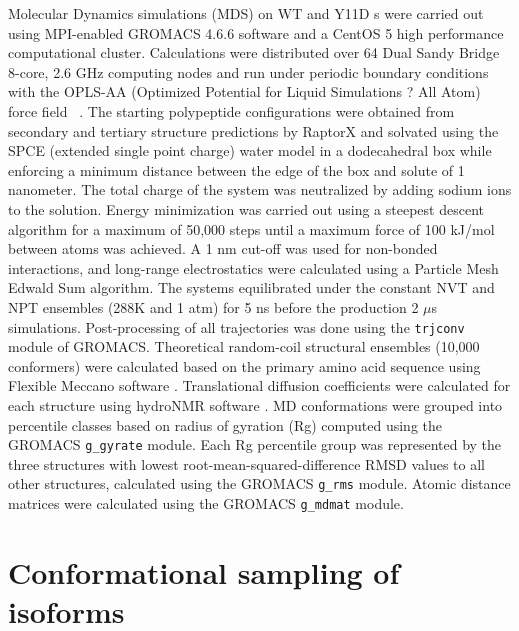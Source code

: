 Molecular Dynamics simulations (MDS) on WT and Y11D \gct{}s were carried out using MPI-enabled GROMACS 4.6.6 software\cite{hess2008gromacs} and a CentOS 5 high performance computational cluster. Calculations were distributed over 64 Dual Sandy Bridge 8-core, 2.6 GHz computing nodes and run under periodic boundary conditions with the OPLS-AA (Optimized Potential for Liquid Simulations ? All Atom) force field ~\cite{kaminski2001evaluation}.  The starting \gct{} polypeptide configurations were obtained from secondary and tertiary structure predictions by RaptorX \cite{kallberg2012template} and solvated using the SPCE (extended single point charge) water model in a dodecahedral box while enforcing a minimum distance between the edge of the box and solute of 1 nanometer. The total charge of the system was neutralized by adding sodium ions to the solution. Energy minimization was carried out using a steepest descent algorithm for a maximum of 50,000 steps until a maximum force of 100 kJ/mol between atoms was achieved. A 1 nm cut-off was used for non-bonded interactions, and long-range electrostatics were calculated using a Particle Mesh Edwald Sum algorithm. The systems equilibrated under the constant NVT and NPT ensembles (288K and 1 atm) for 5 ns before the production 2 $\mu$s simulations. Post-processing of all trajectories was done using the \texttt{trjconv} module of GROMACS. Theoretical random-coil structural ensembles (10,000 conformers) were calculated based on the \gct{} primary amino acid sequence using Flexible Meccano software \cite{ozenne2012flexible}. Translational diffusion coefficients were calculated for each structure using hydroNMR software \cite{de2000hydronmr}. 
MD conformations were grouped into percentile classes based on radius of gyration (Rg) computed using the GROMACS \texttt{g\_gyrate} module. Each Rg percentile group was represented by the three structures with lowest root-mean-squared-difference RMSD values to all other structures, calculated using the GROMACS \texttt{g\_rms} module. Atomic distance matrices were calculated using the GROMACS \texttt{g\_mdmat} module.

\section{Conformational sampling of \gct{} isoforms}

